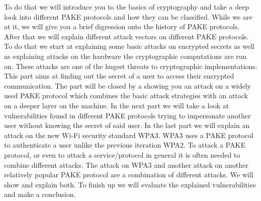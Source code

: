 \documentclass[journal]{IEEEtran}
\begin{document}
To do that we will introduce you to the basics of cryptography and take a deep look into different PAKE protocols and how they can be classified.
While we are at it, we will give you a brief digression onto the history of PAKE protocols.
After that we will explain different attack vectors on different PAKE protocols.
To do that we start at explaining some basic attacks on encrypted secrets as well as explaining attacks on the hardware the cryptographic computations are run on.
These attacks are one of the hugest threats to cryptographic implementations.
This part aims at finding out the secret of a user to access their encrypted communication.
The part will be closed by a showing you an attack on a widely used PAKE protocol which combines the basic attack strategies with an attack on a deeper layer on the machine.
In the next part we will take a look at vulnerabilities found in different PAKE protocols trying to impersonate another user without knowing the secret of said user.
In the last part we will explain an attack on the new Wi-Fi security standard WPA3.
WPA3 uses a PAKE protocol to authenticate a user unlike the previous iteration WPA2.
To attack a PAKE protocol, or even to attack a service/protocol in general it is often needed to combine different attacks. 
The attack on WPA3 and another attack on another relatively popular PAKE protocol are a combination of different attacks.
We will show and explain both.
To finish up we will evaluate the explained vulnerabilities and make a conclusion. \\
\end{document}
